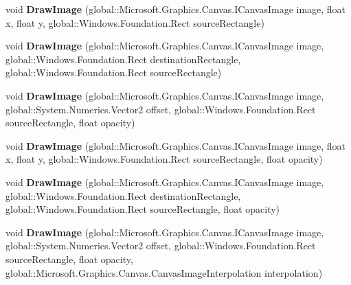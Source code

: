 \begin{DoxyCompactItemize}
void {\bfseries Draw\+Image} (global\+::\+Microsoft.\+Graphics.\+Canvas.\+I\+Canvas\+Image image, float x, float y, global\+::\+Windows.\+Foundation.\+Rect source\+Rectangle)
\item 
\mbox{\label{class_microsoft_1_1_graphics_1_1_canvas_1_1_canvas_drawing_session_a7f77f768e0f4057f678c97ee540a578b}} 
void {\bfseries Draw\+Image} (global\+::\+Microsoft.\+Graphics.\+Canvas.\+I\+Canvas\+Image image, global\+::\+Windows.\+Foundation.\+Rect destination\+Rectangle, global\+::\+Windows.\+Foundation.\+Rect source\+Rectangle)
\item 
\mbox{\label{class_microsoft_1_1_graphics_1_1_canvas_1_1_canvas_drawing_session_a7588275f578557a9405d27c1f53ef863}} 
void {\bfseries Draw\+Image} (global\+::\+Microsoft.\+Graphics.\+Canvas.\+I\+Canvas\+Image image, global\+::\+System.\+Numerics.\+Vector2 offset, global\+::\+Windows.\+Foundation.\+Rect source\+Rectangle, float opacity)
\item 
\mbox{\label{class_microsoft_1_1_graphics_1_1_canvas_1_1_canvas_drawing_session_a706a75446a9c15fe55e9217716f95241}} 
void {\bfseries Draw\+Image} (global\+::\+Microsoft.\+Graphics.\+Canvas.\+I\+Canvas\+Image image, float x, float y, global\+::\+Windows.\+Foundation.\+Rect source\+Rectangle, float opacity)
\item 
\mbox{\label{class_microsoft_1_1_graphics_1_1_canvas_1_1_canvas_drawing_session_a905b60a8b82adc114f6d8420b5096b3a}} 
void {\bfseries Draw\+Image} (global\+::\+Microsoft.\+Graphics.\+Canvas.\+I\+Canvas\+Image image, global\+::\+Windows.\+Foundation.\+Rect destination\+Rectangle, global\+::\+Windows.\+Foundation.\+Rect source\+Rectangle, float opacity)
\item 
\mbox{\label{class_microsoft_1_1_graphics_1_1_canvas_1_1_canvas_drawing_session_a2c9e8c707cb2a9342b462532ffc458ac}} 
void {\bfseries Draw\+Image} (global\+::\+Microsoft.\+Graphics.\+Canvas.\+I\+Canvas\+Image image, global\+::\+System.\+Numerics.\+Vector2 offset, global\+::\+Windows.\+Foundation.\+Rect source\+Rectangle, float opacity, global\+::\+Microsoft.\+Graphics.\+Canvas.\+Canvas\+Image\+Interpolation interpolation)

\end{DoxyCompactItemize}
